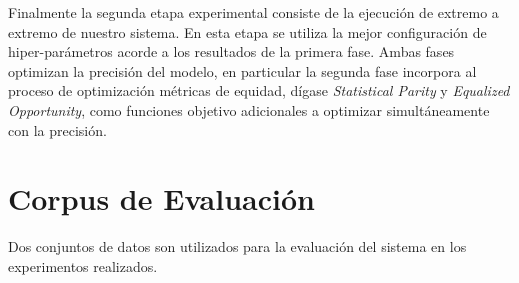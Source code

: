 Finalmente la segunda etapa experimental consiste de la ejecución de extremo a extremo de nuestro sistema.
En esta etapa se utiliza la mejor configuración de hiper-parámetros acorde a los resultados de la primera fase.
Ambas fases optimizan la precisión del modelo, en particular la segunda fase incorpora al proceso de optimización métricas de equidad, dígase \emph{Statistical Parity} y \emph{Equalized Opportunity}, como funciones objetivo adicionales a optimizar simultáneamente con la precisión.

\section{Corpus de Evaluación}

Dos conjuntos de datos son utilizados para la evaluación del sistema en los experimentos realizados.

